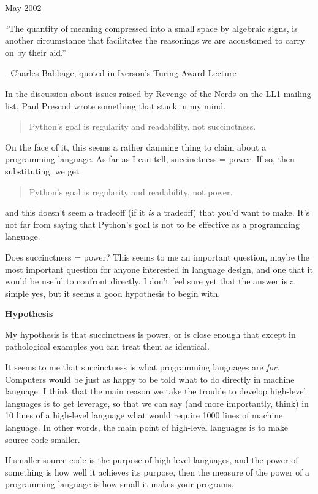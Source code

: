 May 2002

``The quantity of meaning compressed into a small space by algebraic
signs, is another circumstance that facilitates the reasonings we are
accustomed to carry on by their aid.''

- Charles Babbage, quoted in Iverson's Turing Award Lecture

In the discussion about issues raised by \href{icad.html}{Revenge of the
Nerds} on the LL1 mailing list, Paul Prescod wrote something that stuck
in my mind.

\begin{quote}
Python's goal is regularity and readability, not succinctness.
\end{quote}

On the face of it, this seems a rather damning thing to claim about a
programming language. As far as I can tell, succinctness = power. If so,
then substituting, we get

\begin{quote}
Python's goal is regularity and readability, not power.
\end{quote}

and this doesn't seem a tradeoff (if it \emph{is} a tradeoff) that you'd
want to make. It's not far from saying that Python's goal is not to be
effective as a programming language.

Does succinctness = power? This seems to me an important question, maybe
the most important question for anyone interested in language design,
and one that it would be useful to confront directly. I don't feel sure
yet that the answer is a simple yes, but it seems a good hypothesis to
begin with.

\textbf{Hypothesis}

My hypothesis is that succinctness is power, or is close enough that
except in pathological examples you can treat them as identical.

It seems to me that succinctness is what programming languages are
\emph{for.} Computers would be just as happy to be told what to do
directly in machine language. I think that the main reason we take the
trouble to develop high-level languages is to get leverage, so that we
can say (and more importantly, think) in 10 lines of a high-level
language what would require 1000 lines of machine language. In other
words, the main point of high-level languages is to make source code
smaller.

If smaller source code is the purpose of high-level languages, and the
power of something is how well it achieves its purpose, then the measure
of the power of a programming language is how small it makes your
programs.

